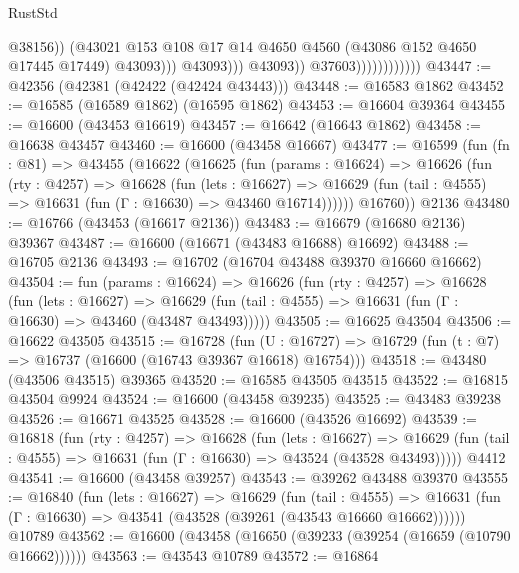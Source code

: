 \begin{lexlean}{RustStd}
\begin{coremodule}
                                              @38156))
                                          (@43021
                                            @153
                                            @108
                                            @17
                                            @14
                                            @4650
                                            @4560
                                            (@43086 @152 @4650 @17445 @17449)
                                            @43093)))
                                      @43093)))
                                @43093))
                            @37603))))))))))))
@43447 := @42356 (@42381 (@42422 (@42424 @43443)))
@43448 := @16583 @1862
@43452 := @16585 (@16589 @1862) (@16595 @1862)
@43453 := @16604 @39364
@43455 := @16600 (@43453 @16619)
@43457 := @16642 (@16643 @1862)
@43458 := @16638 @43457
@43460 := @16600 (@43458 @16667)
@43477 := @16599
    (fun (fn : @81) =>
    @43455
      (@16622
        (@16625
          (fun (params : @16624) =>
          @16626
            (fun (rty : @4257) =>
            @16628
              (fun (lets : @16627) =>
              @16629 (fun (tail : @4555) => @16631 (fun (Γ : @16630) => @43460 @16714))))))
        @16760))
    @2136
@43480 := @16766 (@43453 (@16617 @2136))
@43483 := @16679 (@16680 @2136) @39367
@43487 := @16600 (@16671 (@43483 @16688) @16692)
@43488 := @16705 @2136
@43493 := @16702 (@16704 @43488 @39370 @16660 @16662)
@43504 := fun (params : @16624) =>
  @16626
    (fun (rty : @4257) =>
    @16628
      (fun (lets : @16627) =>
      @16629 (fun (tail : @4555) => @16631 (fun (Γ : @16630) => @43460 (@43487 @43493)))))
@43505 := @16625 @43504
@43506 := @16622 @43505
@43515 := @16728
    (fun (U : @16727) => @16729 (fun (t : @7) => @16737 (@16600 (@16743 @39367 @16618) @16754)))
@43518 := @43480 (@43506 @43515) @39365
@43520 := @16585 @43505 @43515
@43522 := @16815 @43504 @9924
@43524 := @16600 (@43458 @39235)
@43525 := @43483 @39238
@43526 := @16671 @43525
@43528 := @16600 (@43526 @16692)
@43539 := @16818
    (fun (rty : @4257) =>
    @16628
      (fun (lets : @16627) =>
      @16629 (fun (tail : @4555) => @16631 (fun (Γ : @16630) => @43524 (@43528 @43493)))))
    @4412
@43541 := @16600 (@43458 @39257)
@43543 := @39262 @43488 @39370
@43555 := @16840
    (fun (lets : @16627) =>
    @16629
      (fun (tail : @4555) =>
      @16631 (fun (Γ : @16630) => @43541 (@43528 (@39261 (@43543 @16660 @16662))))))
    @10789
@43562 := @16600 (@43458 (@16650 (@39233 (@39254 (@16659 (@10790 @16662))))))
@43563 := @43543 @10789
@43572 := @16864

\end{coremodule}
\end{lexlean}
